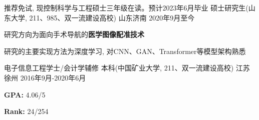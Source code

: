 

\begin{cventries}

  \cventry
    {推荐免试, 现控制科学与工程硕士三年级在读。预计2023年6月毕业} %
    {硕士研究生(山东大学, 211、985、双一流建设高校)} %
    {山东济南} %
    {2020年9月至今} %
    {
      \begin{cvitems} %
        \item {研究方向为面向手术导航的\textbf{医学图像配准技术}}
        \item {研究的主要实现方法为深度学习, 对CNN、GAN、Transformer等模型架构熟悉}
      \end{cvitems}
    }
    \cventry
    {电子信息工程学士/会计学辅修} %
    {本科(中国矿业大学, 211、双一流建设高校)} %
    {江苏徐州} %
    {2016年9月-2020年6月} %
    {
      \begin{cvitems} %
         \item {\textbf{GPA: }4.06/5}
         \item {\textbf{Rank: }24/254}
      \end{cvitems}
    }
    

\end{cventries}
